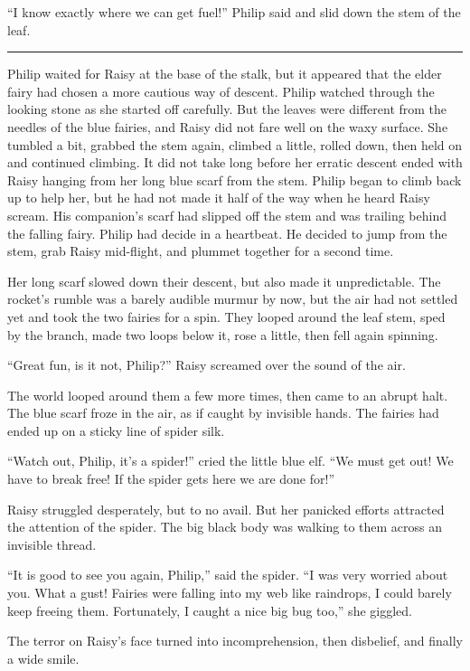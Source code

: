 \documentclass[10pt, draft]{memoir}
\renewcommand{\pfbreakdisplay}{\bigskip \ding{166} \bigskip}
\newcommand{\secbreak}{\fancybreak{\pfbreakdisplay}}
\begin{document}
``I know exactly where we can get fuel!'' Philip said and slid down the stem of
the leaf.

\secbreak

Philip waited for Raisy at the base of the stalk, but it appeared that the
elder fairy had chosen a more cautious way of descent. Philip watched through
the looking stone as she started off carefully. But the leaves were different
from the needles of the blue fairies, and Raisy did not fare well on the waxy
surface. She tumbled a bit, grabbed the stem again, climbed a little, rolled
down, then held on and continued climbing. It did not take long before her
erratic descent ended with Raisy hanging from her long blue scarf from the
stem. Philip began to climb back up to help her, but he had not made it half of
the way when he heard Raisy scream. His companion's scarf had slipped off the
stem and was trailing behind the falling fairy. Philip had decide in a
heartbeat. He decided to jump from the stem, grab Raisy mid-flight, and plummet
together for a second time.

Her long scarf slowed down their descent, but also made it unpredictable. The
rocket's rumble was a barely audible murmur by now, but the air had not settled
yet and took the two fairies for a spin. They looped around the leaf stem, sped
by the branch, made two loops below it, rose a little, then fell again
spinning.

``Great fun, is it not, Philip?'' Raisy screamed over the sound of the air.

The world looped around them a few more times, then came to an abrupt halt. The
blue scarf froze in the air, as if caught by invisible hands. The fairies had
ended up on a sticky line of spider silk.

``Watch out, Philip, it's a spider!'' cried the little blue elf. ``We must get
out! We have to break free! If the spider gets here we are done for!''

Raisy struggled desperately, but to no avail. But her panicked efforts
attracted the attention of the spider. The big black body was walking to them
across an invisible thread.

``It is good to see you again, Philip,'' said the spider. ``I was very worried
about you. What a gust! Fairies were falling into my web like raindrops, I
could barely keep freeing them. Fortunately, I caught a nice big bug too,'' she
giggled.

The terror on Raisy's face turned into incomprehension, then disbelief, and
finally a wide smile.
\end{document}
